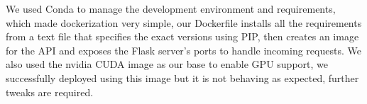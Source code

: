We used Conda to manage the development environment and requirements, which made dockerization very simple, our Dockerfile installs all the requirements from a text file that specifies the exact versions using PIP, then creates an image for the API and exposes the Flask server's ports to handle incoming requests.
We also used the nvidia CUDA image as our base to enable GPU support, we successfully deployed using this image but it is not behaving as expected, further tweaks are required.
